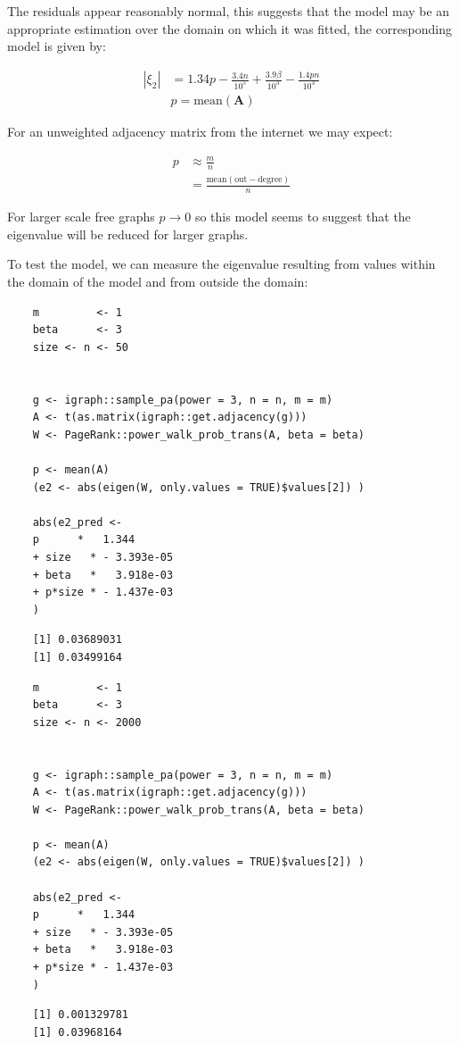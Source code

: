 \documentclass[11pt, twoside]{report}
\begin{document}
The residuals appear reasonably normal, this suggests that the model may be an appropriate estimation over the domain on which it was fitted, the corresponding model is given by:

\begin{align}
\left\lvert \xi_{2} \right\rvert &= 1.34 p -  \frac{3.4n}{10^{5}} + \frac{3.9\beta}{10^{3}} - \frac{1.4 p n}{10^{3}} \\
        &p = \mathrm{mean}\left( \mathbf{A}\right)
\end{align}

For an unweighted adjacency matrix from the internet we may expect:

\begin{align}
p &\approx \frac{m}{n} \\
  &= \frac{\mathrm{mean}\left(\mathrm{out-degree}\right)}{n}
\end{align}

For larger scale free graphs \(p \rightarrow 0\) so this model seems to suggest that the eigenvalue will be reduced for larger graphs.

To test the model, we can measure the eigenvalue resulting from values within the domain of the model and from outside the domain:

\begin{tcolorbox}
    \begin{verbatim}
    m         <- 1
    beta      <- 3
    size <- n <- 50


    g <- igraph::sample_pa(power = 3, n = n, m = m)
    A <- t(as.matrix(igraph::get.adjacency(g)))
    W <- PageRank::power_walk_prob_trans(A, beta = beta)

    p <- mean(A)
    (e2 <- abs(eigen(W, only.values = TRUE)$values[2]) )

    abs(e2_pred <-
    p      *   1.344
    + size   * - 3.393e-05
    + beta   *   3.918e-03
    + p*size * - 1.437e-03
    )
    \end{verbatim}
\tcblower
    \begin{verbatim}
    [1] 0.03689031
    [1] 0.03499164
    \end{verbatim}
\end{tcolorbox}


\begin{tcolorbox}
    \begin{verbatim}
    m         <- 1
    beta      <- 3
    size <- n <- 2000


    g <- igraph::sample_pa(power = 3, n = n, m = m)
    A <- t(as.matrix(igraph::get.adjacency(g)))
    W <- PageRank::power_walk_prob_trans(A, beta = beta)

    p <- mean(A)
    (e2 <- abs(eigen(W, only.values = TRUE)$values[2]) )

    abs(e2_pred <-
    p      *   1.344
    + size   * - 3.393e-05
    + beta   *   3.918e-03
    + p*size * - 1.437e-03
    )
    \end{verbatim}
\tcblower
    \begin{verbatim}
    [1] 0.001329781
    [1] 0.03968164
    \end{verbatim}
\end{tcolorbox}
\end{document}
